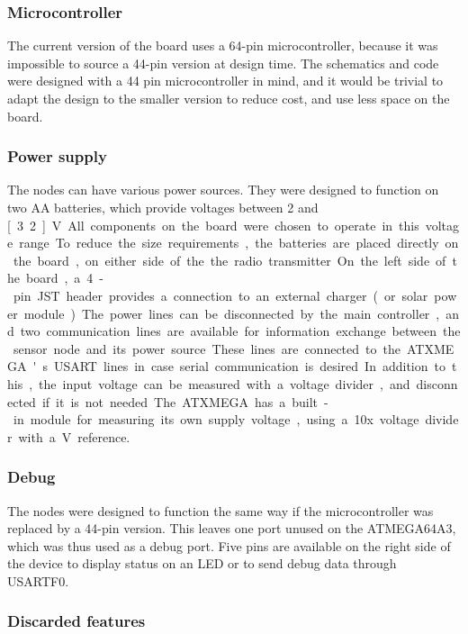 \subsubsection{Microcontroller}

The current version of the board uses a 64-pin microcontroller, because it
was impossible to source a 44-pin version at design time. The schematics and
code were designed with a 44 pin microcontroller in mind, and it would be
trivial to adapt the design to the smaller version to reduce cost, and use less
space on the board.


\subsubsection{Power supply}
The nodes can have various power sources. They were designed to function on two
AA batteries, which provide voltages between 2 and \unit[3.2]{V}. All components on
the board were chosen to operate in this voltage range.

To reduce the size requirements, the batteries are placed directly on the board,
on either side of the the radio transmitter.

On the left side of the board, a 4-pin JST header provides a connection to an
external charger (or solar power module). The power lines can be disconnected by
the main controller, and two communication lines are available for information
exchange between the sensor node and its power source. These lines are connected
to the ATXMEGA's USART lines in case serial communication is desired.

In addition to this, the input voltage can be measured with a voltage divider,
and disconnected if it is not needed. The ATXMEGA has a built-in module for
measuring its own supply voltage, using a 10x voltage divider with a \unit[1]{V}
reference.

\subsubsection{Debug}

The nodes were designed to function the same way if the microcontroller was
replaced by a 44-pin version. This leaves one port unused on the ATMEGA64A3,
which was thus used as a debug port. Five pins are available on the right side
of the device to display status on an LED or to send debug data through USARTF0.

\subsubsection{Discarded features}

